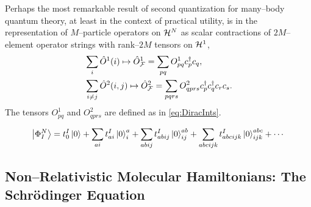 Perhaps the most remarkable result of second quantization for many--body quantum theory, at least in the 
context of practical utility, is in the representation of $M$--particle operators on $\mathcal{H}^N$ as 
scalar contractions of $2M$--element operator strings with rank--$2M$ tensors on $\mathcal{H}^1$,
\begin{subequations}
\begin{align}
  &\sum_i \hat{O}^1(i) \mapsto \hat{O}_{\mathcal{F}}^1 = \sum_{pq}   O^1_{pq} c^\dagger_p c_q,\\
  &\sum_{i\neq j}\hat{O}^2(i,j) \mapsto \hat{O}_{\mathcal{F}}^2 = \sum_{pqrs} O^2_{qprs} c^\dagger _p c^\dagger _q c_r c_s.
\end{align}
\end{subequations}
The tensors $O^1_{pq}$ and $O^2_{qprs}$ are defined as in \cref{eq:DiracInts}.

\begin{equation}
  \left\vert \Phi^N_I \right\rangle = t^I_0\left\vert 0 \right\rangle + \sum_{ai} t^I_{ai} \left\vert 0 \right\rangle_i^a + \sum_{abij} t^I_{abij} \left\vert 0 \right\rangle_{ij}^{ab} + \sum_{abcijk} t^I_{abcijk} \left\vert 0 \right\rangle_{ijk}^{abc} + \cdots
\end{equation}






\subsection{Non--Relativistic Molecular Hamiltonians: The Schr\"{o}dinger Equation}
\label{sec:NRH}

